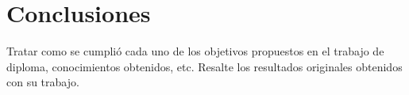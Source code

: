 \chapter*{\large Conclusiones}


\lettrine[lines=2, lraise=0, nindent=0em, slope=-.5em]{T}{}ratar como se cumplió cada uno de los objetivos 
propuestos en el trabajo de diploma, conocimientos obtenidos, etc. Resalte los resultados originales 
obtenidos con su trabajo.

